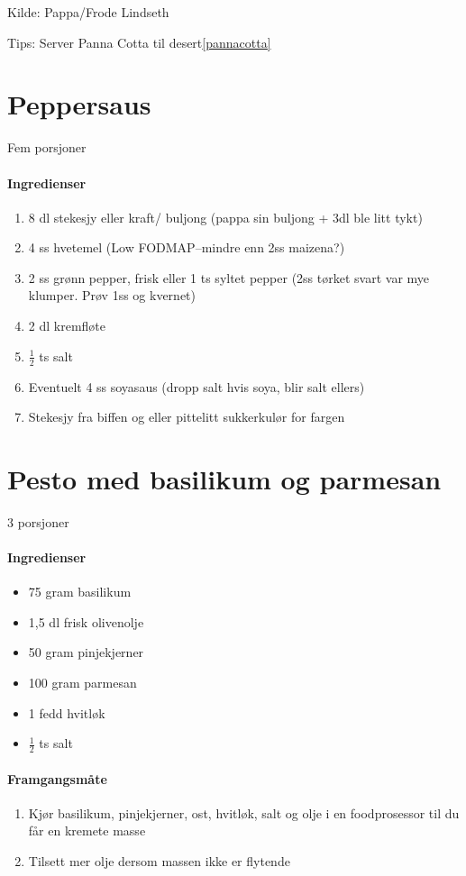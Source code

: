 \documentclass[12pt,a4paper]{book}
\begin{document}
{Kilde: Pappa/Frode Lindseth

Tips: Server Panna Cotta til desert\ref{pannacotta}
\clearpage{}
\clearpage{}\section{﻿Peppersaus}
\label{peppersaus}
Fem porsjoner

\paragraph{Ingredienser}
\begin{enumerate}[noitemsep]
	\item 8 dl stekesjy eller kraft/ buljong (pappa sin buljong + 3dl ble litt tykt)
	\item 4 ss hvetemel (Low FODMAP--mindre enn 2ss maizena?)
	\item 2 ss grønn pepper, frisk eller 1 ts syltet pepper (2ss tørket svart var mye klumper.  Prøv 1ss og kvernet)
	\item 2 dl kremfløte
	\item  $\frac{1}{2}$  ts salt
	\item Eventuelt 4 ss soyasaus (dropp salt hvis soya, blir salt ellers)
	\item Stekesjy fra biffen og eller pittelitt sukkerkulør for fargen
\end{enumerate}
\clearpage{}
\clearpage{}\section{﻿Pesto med basilikum og parmesan}
3 porsjoner

\paragraph{Ingredienser}
\begin{itemize}[noitemsep]
	\item 75 gram basilikum
	\item 1,5 dl frisk olivenolje
	\item 50 gram pinjekjerner
	\item 100 gram parmesan
	\item 1 fedd hvitløk
	\item  $\frac{1}{2}$  ts salt
\end{itemize}

\paragraph{Framgangsmåte}
\begin{enumerate}[noitemsep]
	\item Kjør basilikum, pinjekjerner, ost, hvitløk, salt og olje i en foodprosessor til du får en kremete masse
	\item Tilsett mer olje dersom massen ikke er flytende
\end{enumerate}

}
\end{document}

